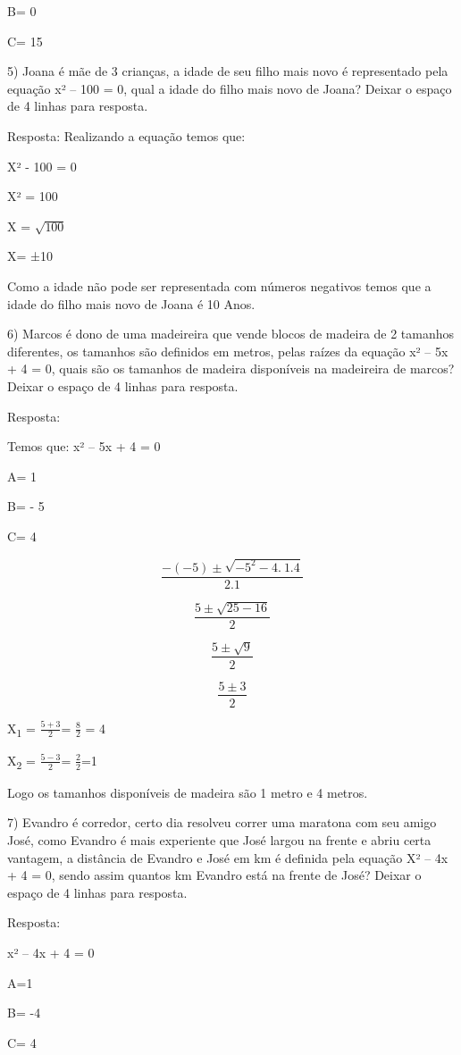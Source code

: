 B= 0

C= 15

5) Joana é mãe de 3 crianças, a idade de seu filho mais novo é
representado pela equação x² -- 100 = 0, qual a idade do filho mais novo
de Joana? Deixar o espaço de 4 linhas para resposta.

Resposta: Realizando a equação temos que:

X² - 100 = 0

X² = 100

X = \(\sqrt{100}\)

X= ±10

Como a idade não pode ser representada com números negativos temos que a
idade do filho mais novo de Joana é 10 Anos.

6) Marcos é dono de uma madeireira que vende blocos de madeira de 2
tamanhos diferentes, os tamanhos são definidos em metros, pelas raízes
da equação x² -- 5x + 4 = 0, quais são os tamanhos de madeira
disponíveis na madeireira de marcos? Deixar o espaço de 4 linhas para
resposta.

Resposta:

Temos que: x² -- 5x + 4 = 0

A= 1

B= - 5

C= 4

\[\frac{- ( - 5) \pm \sqrt{{- 5}^{2} - 4.\ 1.4}}{2.1}\]

\[\frac{5 \pm \sqrt{25 - 16}}{2}\]

\[\frac{5 \pm \sqrt{9}}{2}\]

\[\frac{5 \pm 3}{2}\]

X\textsubscript{1} = \(\frac{5 + 3}{2}\)= \(\frac{8}{2}\) = 4

X\textsubscript{2} = \(\frac{5 - 3}{2}\)= \(\frac{2}{2}\)=1

Logo os tamanhos disponíveis de madeira são 1 metro e 4 metros.

7) Evandro é corredor, certo dia resolveu correr uma maratona com seu
amigo José, como Evandro é mais experiente que José largou na frente e
abriu certa vantagem, a distância de Evandro e José em km é definida
pela equação X² -- 4x + 4 = 0, sendo assim quantos km Evandro está na
frente de José? Deixar o espaço de 4 linhas para resposta.

Resposta:

x² -- 4x + 4 = 0

A=1

B= -4

C= 4

